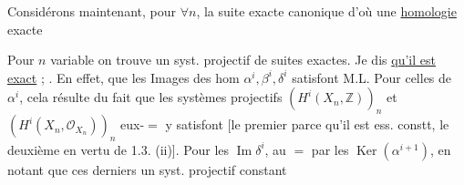 Considérons maintenant, pour $\forall n$, la suite exacte canonique
d'où une \uline{homologie} exacte

Pour $n$ variable on trouve un syst.  projectif de suites exactes. Je dis \uline{qu'il est exact} ; . En effet,   que les Images des hom $\alpha^i,\beta^i,\delta^i$ satisfont M.L. Pour celles de $\alpha^i$, cela résulte du fait que  les systèmes projectifs $(H^i(X_n,\mathbb Z))_n$ et $(H^i(X_n,\mathcal O_{X_n}))_n$ eux-$=$ y satisfont [le premier parce qu'il est ess. constt, le deuxième en vertu de 1.3. (ii)]. Pour les $\operatorname{Im}\delta^i$,  au $=$ par les $\operatorname{Ker}(\alpha^{i+1})$, en notant que ces derniers   un syst. projectif constant

